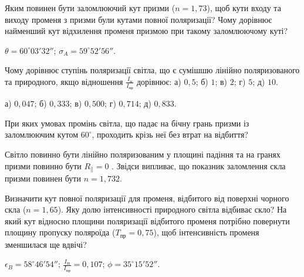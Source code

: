 \begin{problem}%
    Яким повинен бути заломлюючий кут призми ($ n = 1,73 $), щоб кути входу та виходу променя з призми були кутами повної поляризації? Чому дорівнює найменший кут відхилення променя призмою при такому заломлюючому куті?
    \begin{solution}
        $ \theta = 60^\circ03'32'' $; $ \sigma_A = 59^\circ52'56'' $.
    \end{solution}
\end{problem}


\begin{problem}%
    Чому дорівнює ступінь поляризації світла, що є сумішшю лінійно поляризованого та природного, якщо відношення $ \frac{I_\text{п}}{I_\text{пр}} $ дорівнює: а) $ 0,5 $; б) $ 1 $; в) $ 2 $; г) $ 5 $; д) $ 10 $.
    \begin{solution}
         а) $0,047$; б) $0,333$; в) $0,500$; г) $0,714$; д) $0,833 $.
    \end{solution}
\end{problem}


\begin{problem}%
    При яких умовах промінь світла, що падає на бічну грань призми із
    заломлюючим кутом $ 60^\circ $, проходить крізь неї без втрат на відбиття?
    \begin{solution}
        Світло повинно бути лінійно поляризованим у площині падіння та на гранях призми повинно бути $ R_{\parallel} = 0 $ . Звідси випливає, що показник заломлення скла призми повинен бути $ n = 1,732 $.
    \end{solution}
\end{problem}


\begin{problem}%
    Визначити кут повної поляризації для променя, відбитого від поверхні чорного скла ($ n = 1,65 $). Яку долю інтенсивності природного світла відбиває скло? На який кут відносно площини поляризації відбитого променя потрібно повернути площину пропуску поляроїда ($ T_\text{пр} = 0,75 $), щоб інтенсивність променя зменшилася ще вдвічі?
    \begin{solution}
        $ \epsilon_B = 58^\circ46'54'' $; $ \frac{I_\text{П}}{I_\text{пр}} = 0,107 $; $ \phi = 35^\circ15'52'' $.
    \end{solution}
\end{problem}


